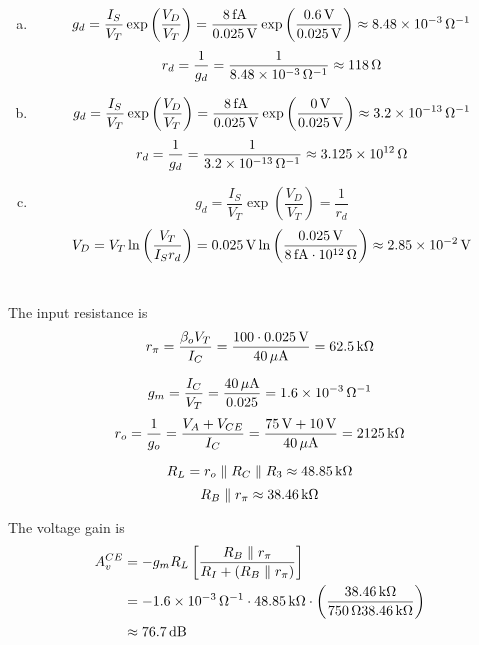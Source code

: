 \documentclass{article}
\newcommand{\unit}[1]{{\rm\,#1}}
\begin{document}
\section{}
\begin{enumerate}[(a)]
\item $$g_d=\frac{I_S}{V_T}\exp\left(\frac{V_D}{V_T}\right)=\frac{8\unit{fA}}{0.025\unit{V}}\exp\left(\frac{0.6\unit{V}}{0.025\unit{V}}\right)\approx8.48\times10^{-3}\unit{\Omega^{-1}}$$
$$r_d=\frac{1}{g_d}=\frac{1}{8.48\times10^{-3}\unit{\Omega^{-1}}}\approx118\unit{\Omega}$$
\item $$g_d=\frac{I_S}{V_T}\exp\left(\frac{V_D}{V_T}\right)=\frac{8\unit{fA}}{0.025\unit{V}}\exp\left(\frac{0\unit{V}}{0.025\unit{V}}\right)\approx3.2\times10^{-13}\unit{\Omega^{-1}}$$
$$r_d=\frac{1}{g_d}=\frac{1}{3.2\times10^{-13}\unit{\Omega^{-1}}}\approx3.125\times10^{12}\unit{\Omega}$$
\item $$g_d=\frac{I_S}{V_T}\exp\left(\frac{V_D}{V_T}\right)=\frac{1}{r_d}$$
$$V_D=V_T\ln\left(\frac{V_T}{I_Sr_d}\right)=0.025\unit{V}\ln\left(\frac{0.025\unit{V}}{8\unit{fA}\cdot10^{12}\unit{\Omega}}\right)\approx2.85\times10^{-2}\unit{V}$$
\end{enumerate}

\section{}
The input resistance is
$$r_\pi=\frac{\beta_oV_T}{I_C}=\frac{100\cdot0.025\unit{V}}{40\unit{\mu A}}=62.5\unit{k\Omega}$$

$$g_m=\frac{I_C}{V_T}=\frac{40\unit{\mu A}}{0.025}=1.6\times10^{-3}\unit{\Omega^{-1}}$$
$$r_o=\frac{1}{g_o}=\frac{V_A+V_{CE}}{I_C}=\frac{75\unit{V}+10\unit{V}}{40\unit{\mu A}}=2125\unit{k\Omega}$$

$$R_L=r_o\parallel R_C\parallel R_3\approx48.85\unit{k\Omega}$$
$$R_B\parallel r_\pi\approx38.46\unit{k\Omega}$$

The voltage gain is
\begin{align*}
A_v^{CE}&=-g_mR_L\left[\frac{R_B\parallel r_\pi}{R_I+(R_B\parallel r_\pi)}\right]\\
&=-1.6\times10^{-3}\unit{\Omega^{-1}}\cdot48.85\unit{k\Omega}\cdot\left(\frac{38.46\unit{k\Omega}}{750\unit{\Omega}38.46\unit{k\Omega}}\right)\\
&\approx76.7\unit{dB}
\end{align*}
\end{document}
